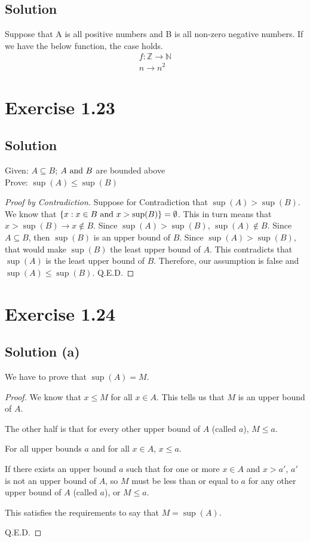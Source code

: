 \documentclass[12pt]{report}
\begin{document}
\subsection*{Solution}
    Suppose that A is all positive numbers and B is all non-zero negative numbers.
    If we have the below function, the case holds.
    \begin{gather}
        f: \mathbb{Z} \to \mathbb{N}\\
        n \to n^2
    \end{gather}

\pagebreak
\section{Exercise 1.23}

\subsection*{Solution}
    Given: $A \subseteq B$; $A \text{ and } B$ are bounded above\\
    Prove: $\sup(A) \leq \sup(B)$
    \begin{proof}[Proof by Contradiction]
        Suppose for Contradiction that $\sup(A) > \sup(B)$.
        We know that $\{x : x \in B \text{ and } x > \sup(B)\} = \emptyset$.
        This in turn means that $x > \sup(B) \to x \notin B$.
        Since $\sup(A) > \sup(B)$, $\sup(A) \notin B$.
        Since $A \subseteq B$, then $\sup(B)$ is an upper bound of $B$.
        Since $\sup(A) > \sup(B)$, that would make $\sup(B)$ the least upper bound of $A$.
        This contradicts that $\sup(A)$ is the least upper bound of $B$.
        Therefore, our assumption is false and $\sup(A) \leq \sup(B)$.
        Q.E.D.
    \end{proof}

\pagebreak
\section{Exercise 1.24}

\subsection{Solution (a)}
    We have to prove that $\sup(A) = M$.
    \begin{proof}
        We know that $x \leq M$ for all $x \in A$.
        This tells us that $M$ is an upper bound of $A$.

        The other half is that for every other upper bound of $A$ (called $a$), $M \leq a$.

        For all upper bounds $a$ and for all $x \in A$, $x \leq a$. 

        If there exists an upper bound $a$ such that for one or more $x \in A$ and $x > a'$, $a'$ is not an upper bound of $A$, so $M$ must be less than or equal to $a$ for any other upper bound of $A$ (called $a$), or $M \leq a$.

        This satisfies the requirements to say that $M = \sup(A)$.

        Q.E.D.
    \end{proof}
\end{document}
